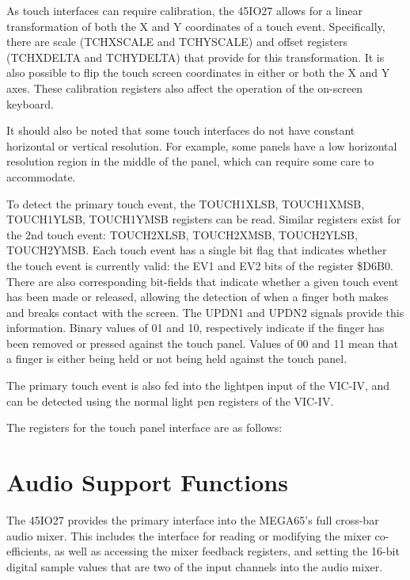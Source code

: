 As touch interfaces can require calibration, the 45IO27 allows for a
linear transformation of both the X and Y coordinates of a touch
event.  Specifically, there are scale (TCHXSCALE and TCHYSCALE) and
offset registers (TCHXDELTA and TCHYDELTA) that provide for this
transformation. It is also possible to flip the touch screen
coordinates in either or both the X and Y axes.  These calibration
registers also affect the operation of the on-screen keyboard.

It should also be noted that some touch interfaces do not have
constant horizontal or vertical resolution. For example, some panels
have a low horizontal resolution region in the middle of the panel,
which can require some care to accommodate.

To detect the primary touch event, the TOUCH1XLSB, TOUCH1XMSB, TOUCH1YLSB,
TOUCH1YMSB registers can be read.  Similar registers exist for the 2nd
touch event: TOUCH2XLSB, TOUCH2XMSB, TOUCH2YLSB, TOUCH2YMSB. Each
touch event has a single bit flag that indicates whether the touch
event is currently valid: the EV1 and EV2 bits of the register
\$D6B0.  There are also corresponding bit-fields that indicate whether a
given touch event has been made or released, allowing the detection of
when a finger both makes and breaks contact with the screen.  The
UPDN1 and UPDN2 signals provide this information.  Binary values of 01 and
10, respectively indicate if the finger has been removed or pressed
against the touch panel.  Values of 00 and 11 mean that a finger is
either being held or not being held against the touch panel.

The
primary touch event is also fed into the lightpen input of the VIC-IV,
and can be detected using the normal light pen registers of the VIC-IV.

The registers for the touch panel interface are as follows:



\section{Audio Support Functions}
The 45IO27 provides the primary interface into the MEGA65's full
cross-bar audio mixer. This includes the interface for reading or
modifying the mixer co-efficients, as well as accessing the mixer
feedback registers, and setting the 16-bit digital sample values that
are two of the input channels into the audio mixer.

